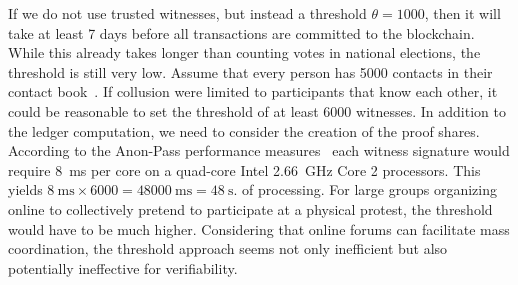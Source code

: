 If we do not use trusted witnesses, but instead a threshold \(\theta = 1000\), then it will take at least 7 days before all transactions are committed to the blockchain. 
While this already takes longer than counting votes in national elections, the threshold is still very low. 
Assume that every person has 5000 contacts in their contact book~\cite{DifficultyOfPrivateContactDiscovery}.
If collusion were limited to participants that know each other, it could be reasonable to set the threshold of at least 6000 witnesses. 
In addition to the ledger computation, we need to consider the creation of the proof shares. 
According to the Anon-Pass performance measures~\cite{AnonPass} each witness signature would require \SI{8}{\milli\second} per core on a quad-core Intel \SI{2.66}{\giga\hertz} Core 2 processors.
This yields \(
  \SI{8}{\milli\second}\times 6000 = \SI{48000}{\milli\second} = 
  \SI{48}{\second}.
\) of processing. 
For large groups organizing online to collectively pretend to participate at a physical protest, the threshold would have to be much higher. 
Considering that online forums can facilitate mass coordination, the threshold approach seems not only inefficient but also potentially ineffective for verifiability.



